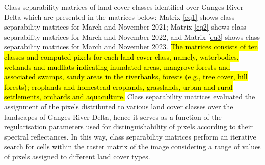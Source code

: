 \documentclass[water,article,submit,pdftex,moreauthors]{Definitions/mdpi}
\begin{document}
Class separability matrices of land cover classes identified over Ganges River Delta which are presented in the matrices below: Matrix \ref{eq1} shows class separability matrices for March and November 2021; Matrix \ref{eq2} shows class separability matrices for March and November 2022, and Matrix \ref{eq3} shows class separability matrices for March and November 2023. \hl{The matrices consists of ten classes and computed pixels for each land cover class, namely, waterbodies, wetlands and mudflats indicating inundated areas,  mangrove forests and associated swamps, sandy areas in the riverbanks, forests (e.g., tree cover, hill forests); croplands and homestead croplands, grasslands, urban and rural settlements, orchards and aquaculture. }Class separability matrices evaluated the assignment of the pixels distributed to various land cover classes over the landscapes of Ganges River Delta, hence it serves as a function of the regularisation parameters used for distinguishability of pixels according to their spectral reflectances. In this way, class separability matrices perform an iterative search for cells within the raster matrix of the image considering a range of values of pixels assigned to different land cover types.
\end{document}
